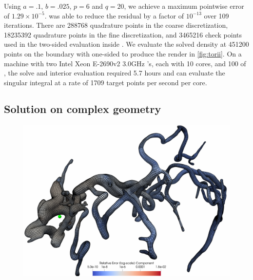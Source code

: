 Using $a=.1$, $b=.025$, $p=6$ and $q=20$, we achieve a maximum pointwise error of $1.29\times 10^{-5}$. 
\gmres was able to reduce the residual by a factor of $10^{-13}$ over 109 iterations.
There are 288768 quadrature points in the coarse discretization, 18235392 quadrature points in the fine discretization, and 3465216 check points used in the two-sided \qbkix evaluation inside \gmres.
We evaluate the solved density at 451200 points on the boundary with one-sided \qbkix to produce the render in \cref{fig:torii}.
On a machine with two Intel Xeon E-2690v2 3.0GHz 's, each with 10 cores, and 100  of ,
the \gmres solve and interior evaluation required 5.7 hours and can evaluate the singular integral at a rate of 1709 target points per second per core.


\subsection{Solution on complex geometry\label{sec:results-blood-vessel}}

\begin{figure}[!htb]
  \centering
  \setlength\figureheight{1.9in}
  \setlength\figurewidth{2.1in}
  \hfill
  \begin{minipage}{.7\textwidth}
    \includegraphics[width=\linewidth]{figs/largest_vessel_section.png}
  \end{minipage}\hfill
\end{figure}


